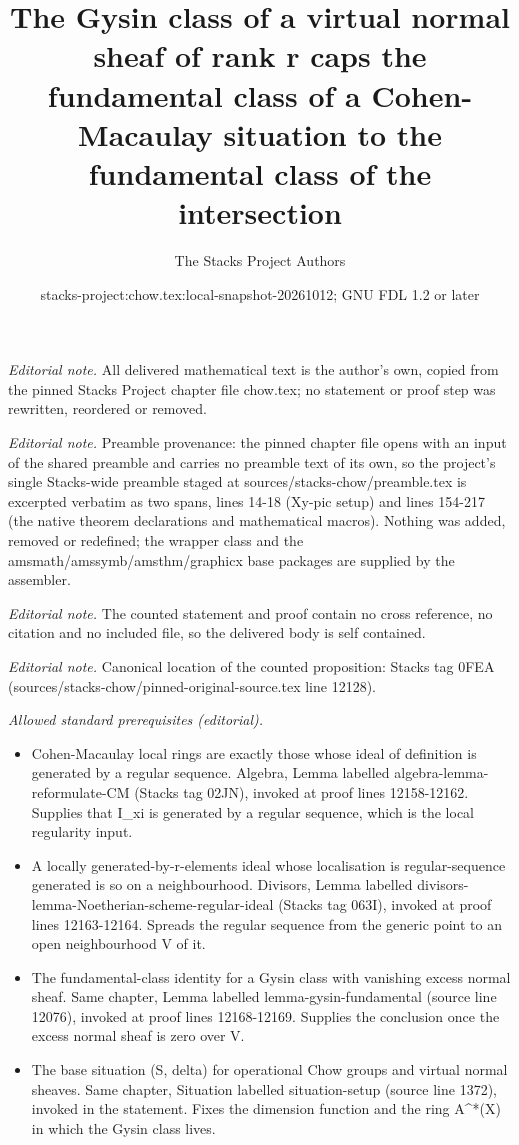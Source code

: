 \documentclass[10pt,a4paper]{amsart}
\title{The Gysin class of a virtual normal sheaf of rank r caps the fundamental class of a Cohen-Macaulay situation to the fundamental class of the intersection}
\author{The Stacks Project Authors}
\date{stacks-project:chow.tex:local-snapshot-20261012; GNU FDL 1.2 or later}
\theoremstyle{plain}
\theoremstyle{definition}
\theoremstyle{remark}
\numberwithin{equation}{subsection}
\begin{document}
\maketitle
\noindent\textit{Editorial note.} All delivered mathematical text is the author's own, copied from the pinned Stacks Project chapter file chow.tex; no statement or proof step was rewritten, reordered or removed.\par\medskip
\noindent\textit{Editorial note.} Preamble provenance: the pinned chapter file opens with an input of the shared preamble and carries no preamble text of its own, so the project's single Stacks-wide preamble staged at sources/stacks-chow/preamble.tex is excerpted verbatim as two spans, lines 14-18 (Xy-pic setup) and lines 154-217 (the native theorem declarations and mathematical macros). Nothing was added, removed or redefined; the wrapper class and the amsmath/amssymb/amsthm/graphicx base packages are supplied by the assembler.\par\medskip
\noindent\textit{Editorial note.} The counted statement and proof contain no cross reference, no citation and no included file, so the delivered body is self contained.\par\medskip
\noindent\textit{Editorial note.} Canonical location of the counted proposition: Stacks tag 0FEA (sources/stacks-chow/pinned-original-source.tex line 12128).\par\medskip
\noindent\textit{Allowed standard prerequisites (editorial).}\begin{itemize}
\item Cohen-Macaulay local rings are exactly those whose ideal of definition is generated by a regular sequence. Algebra, Lemma labelled algebra-lemma-reformulate-CM (Stacks tag 02JN), invoked at proof lines 12158-12162. Supplies that I\_xi is generated by a regular sequence, which is the local regularity input.
\item A locally generated-by-r-elements ideal whose localisation is regular-sequence generated is so on a neighbourhood. Divisors, Lemma labelled divisors-lemma-Noetherian-scheme-regular-ideal (Stacks tag 063I), invoked at proof lines 12163-12164. Spreads the regular sequence from the generic point to an open neighbourhood V of it.
\item The fundamental-class identity for a Gysin class with vanishing excess normal sheaf. Same chapter, Lemma labelled lemma-gysin-fundamental (source line 12076), invoked at proof lines 12168-12169. Supplies the conclusion once the excess normal sheaf is zero over V.
\item The base situation (S, delta) for operational Chow groups and virtual normal sheaves. Same chapter, Situation labelled situation-setup (source line 1372), invoked in the statement. Fixes the dimension function and the ring A\textasciicircum{}*(X) in which the Gysin class lives.
\end{itemize}\medskip
\end{document}
